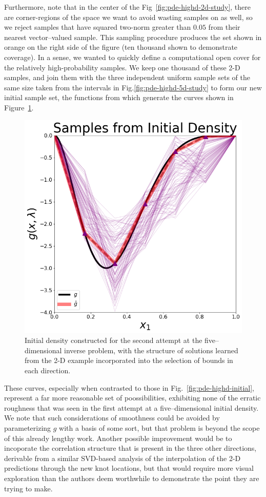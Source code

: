 Furthermore, note that in the center of the Fig~\ref{fig:pde-highd-2d-study}, there are corner-regions of the space we want to avoid wasting samples on as well, so we reject samples that have squared two-norm greater than $0.05$ from their nearest vector--valued sample.
This sampling procedure produces the set shown in orange on the right side of the figure (ten thousand shown to demonstrate coverage).
In a sense, we wanted to quickly define a computational open cover for the relatively high-probability samples.
We keep one thousand of these 2-D samples, and join them with the three independent uniform sample sets of the same size taken from the intervals in Fig.\ref{fig:pde-highd-5d-study} to form our new initial sample set, the functions from which generate the curves shown in Figure~\ref{fig:pde-highd-5d-init}.

\begin{figure}[htbp]
\centering
  \includegraphics[width=0.675\linewidth]{figures/pde-highd/pde-highd_init_D5-alt}
\caption{
Initial density constructed for the second attempt at the five--dimensional inverse problem, with the structure of solutions learned from the 2-D example incorporated into the selection of bounds in each direction.
}
\label{fig:pde-highd-5d-init}
\end{figure}

These curves, especially when contrasted to those in Fig.~\ref{fig:pde-highd-initial}, represent a far more reasonable set of poossibilities, exhibiting none of the erratic roughness that was seen in the first attempt at a five--dimensional initial density.
We note that such considerations of smoothness could be avoided by parameterizing $g$ with a basis of some sort, but that problem is beyond the scope of this already lengthy work.
Another possible improvement would be to incoporate the correlation structure that is present in the three other directions, derivable from a similar SVD-based analysis of the interpolation of the 2-D predictions through the new knot locations, but that would require more visual exploration than the authors deem worthwhile to demonstrate the point they are trying to make.

